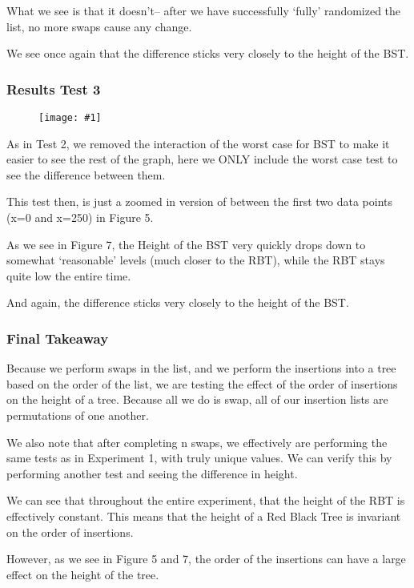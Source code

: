\documentclass{article}
\newcommand{\figureInsetScaled}[3]
{
    \FloatBarrier{}
    \figureRaw{#1}{#2}{#3}
    \FloatBarrier{}
}
\newcommand{\figureRaw}[3]
{
    \begin{figure}[ht!]
        \centering
        \texttt{[image: \#1]}
        \caption{#2}
    \end{figure}
}
\begin{document}
What we see is that it doesn't-- after we have successfully `fully' randomized the list, no more swaps cause any change.

We see once again that the difference sticks very closely to the height of the BST.

\subsubsection{Results Test 3}
\figureInsetScaled{images/experiment2/Figure_3.png}{}{0.5}

As in Test 2, we removed the interaction of the worst case for BST to make it easier to see the rest of the graph, here we ONLY include the worst case test to see the difference between them.

This test then, is just a zoomed in version of between the first two data points (x=0 and x=250) in Figure 5.

As we see in Figure 7, the Height of the BST very quickly drops down to somewhat `reasonable' levels (much closer to the RBT), while the RBT stays quite low the entire time. 

And again, the difference sticks very closely to the height of the BST.

\subsubsection{Final Takeaway}

Because we perform swaps in the list, and we perform the insertions into a tree based on the order of the list, we are testing the effect of the order of insertions on the height of a tree. Because all we do is swap, all of our insertion lists are permutations of one another.

We also note that after completing n swaps, we effectively are performing the same tests as in Experiment 1, with truly unique values. We can verify this by performing another test and seeing the difference in height.

We can see that throughout the entire experiment, that the height of the RBT is effectively constant. This means that the height of a Red Black Tree is invariant on the order of insertions.

However, as we see in Figure 5 and 7, the order of the insertions can have a large effect on the height of the tree.

\end{document}
